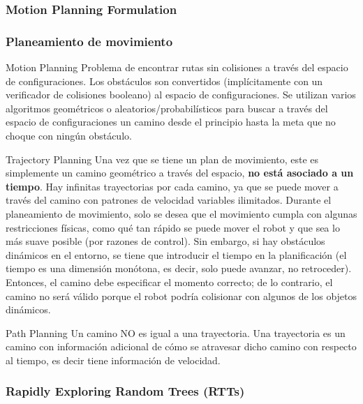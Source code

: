 \begin{frame}
	\frametitle{Motion Planning Formulation}
	
\end{frame}


\begin{frame}
	\frametitle{Planeamiento de movimiento}
	
	\begin{block}{Motion Planning}
		Problema de encontrar rutas sin colisiones a través del espacio de configuraciones. Los obstáculos son convertidos (implícitamente con un verificador de colisiones booleano) al espacio de configuraciones. Se utilizan varios algoritmos geométricos o aleatorios/probabilísticos para buscar a través del espacio de configuraciones un camino desde el principio hasta la meta que no choque con ningún obstáculo.
	\end{block}

	\begin{block}{Trajectory Planning}
		Una vez que se tiene un plan de movimiento, este es simplemente un camino geométrico a través del espacio, {\bf no está asociado a un tiempo}. Hay infinitas trayectorias por  cada camino, ya que se puede mover a través del camino con patrones de velocidad variables ilimitados. Durante el planeamiento de movimiento, solo se desea que el movimiento cumpla con algunas restricciones físicas, como qué tan rápido se puede mover el robot y que sea lo más suave posible (por razones de control). Sin embargo, si hay obstáculos dinámicos en el entorno, se tiene que introducir el tiempo en la planificación (el tiempo es una dimensión monótona, es decir, solo puede avanzar, no retroceder). Entonces, el camino debe especificar el momento correcto; de lo contrario, el camino no será válido porque el robot podría colisionar con algunos de los objetos dinámicos.
	\end{block}

	\begin{block}{Path Planning}
	Un camino NO es igual a una trayectoria. Una trayectoria es un camino con información adicional de cómo se atravesar dicho camino con respecto al tiempo, es decir tiene información de velocidad.
	\end{block}
\end{frame}


\begin{frame}
	\frametitle{Rapidly Exploring Random Trees (RTTs)}
	
\end{frame}

